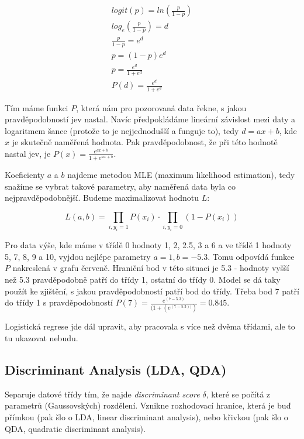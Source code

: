 \documentclass[10pt,a4paper]{article}
\begin{document}
\begin{equation}
\begin{split}
logit(p)=ln(\frac{p}{1-p})\\
log_e(\frac{p}{1-p}) = d\\
\frac{p}{1-p} = e^d\\
p = (1-p)e^d\\
p = \frac{e^d}{1+e^d}\\
P(d) = \frac{e^d}{1+e^d}
\end{split}
\end{equation}

Tím máme funkci $P$, která nám pro pozorovaná data řekne, s jakou pravděpodobností jev nastal. Navíc předpokládáme lineární závislost mezi daty a logaritmem šance (protože to je nejjednodušší a funguje to), tedy $d = ax + b$, kde $x$ je skutečně naměřená hodnota. Pak pravděpodobnost, že při této hodnotě nastal jev, je $P(x) = \frac{e^{ax+b}}{1+e^{ax+b}}$.

Koeficienty $a$ a $b$ najdeme metodou MLE (maximum likelihood estimation), tedy snažíme se vybrat takové parametry, aby naměřená data byla co nejpravděpodobnější. Budeme maximalizovat hodnotu $L$:

\begin{equation}
L(a, b) = \prod_{i, y_i = 1}P(x_i)\cdot\prod_{i, y_i = 0}(1 - P(x_i))
\end{equation}

Pro data výše, kde máme v třídě 0 hodnoty 1, 2, 2.5, 3 a 6 a ve třídě 1 hodnoty 5, 7, 8, 9 a 10, vyjdou nejlépe parametry $a=1, b=-5.3$. Tomu odpovídá funkce $P$ nakreslená v grafu červeně. Hraniční bod v této situaci je 5.3 - hodnoty vyšší než 5.3 pravděpodobně patří do třídy 1, ostatní do třídy 0. Model se dá taky použít ke zjištění, s jakou pravděpodobností patří bod do třídy. Třeba bod 7 patří do třídy 1 s pravděpodobností $P(7) = \frac{e ^{(7 - 5.3)}}{(1 + (e ^{(7 - 5.3))})} = 0.845$.

Logistická regrese jde dál upravit, aby pracovala s více než dvěma třídami, ale to tu ukazovat nebudu.


\subsection{Discriminant Analysis (LDA, QDA)}

Separuje datové třídy tím, že najde \textit{discriminant score} $\delta$, které se počítá z parametrů (Gaussovských) rozdělení. Vznikne rozhodovací hranice, která je buď přímkou (pak šlo o LDA, linear discriminant analysis), nebo křivkou (pak šlo o QDA, quadratic discriminant analysis).
\end{document}

